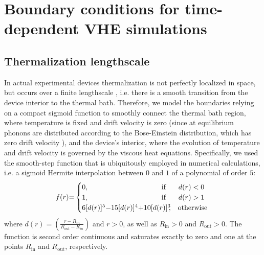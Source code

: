 \documentclass[
prb,
twocolumn,
superscriptaddress,
 amsmath,amssymb,
 aps,
longbibliography,
]{revtex4-2}
\begin{document}
\section{Boundary conditions for time-dependent VHE simulations}
\label{sec:boundary_conditions_for_time_dependent_simulations}

\subsection{Thermalization lengthscale}
\label{sub:modeling_realistic_thermalization}
In actual experimental devices thermalization is not perfectly localized in space, but occurs over a finite lengthscale \cite{braun_spatially_2022}, i.e. there is a smooth transition from the device interior to the thermal bath.
Therefore, we model the boundaries relying on a compact sigmoid function \cite{Bump} to smoothly connect the thermal bath region, where temperature is fixed and drift velocity is zero (since at equilibrium phonons are distributed according to the Bose-Einstein distribution, which has zero drift velocity \cite{Simoncelli2020}), and the device's interior, where the evolution of temperature and drift velocity is governed by the viscous heat equations.
Specifically, we used the smooth-step function \cite{Sigmoid} that is ubiquitously employed in numerical calculations, i.e. a sigmoid Hermite interpolation between $0$ and $1$ of a polynomial of order $5$:
\begin{equation}
  \begin{split}
\hspace{-1mm}f(r){=}
    \begin{cases}
        0, &  \hspace{-8mm}{\rm if\;}\hspace{5mm}d(r) < 0\\
        1 ,& \hspace{-8mm} {\rm if\;}\hspace{5mm}d(r) > 1\\
        {6[d(r)]^5{-}15[d(r)]^4{+}10[d(r)]^3\hspace*{-1mm},} & {\rm otherwise}
    \end{cases}
    \label{eq:sigmoid}
      \end{split}
      \raisetag{20mm}
\end{equation}
where $d(r)=\left(\frac{r{-}R_{in}}{R_{out}{-}R_{in}}\right)$ and $r>0$, as well as $R_\text{in}>0$ and $R_\text{out}>0$. The function is second order continuous and saturates exactly to zero and one at the points $R_\text{in}$ and $R_\text{out}$, respectively.
\end{document}
